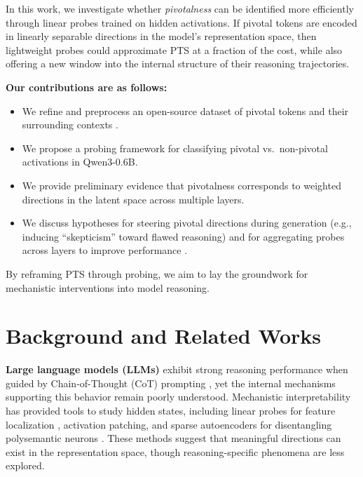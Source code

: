 \documentclass{article}
\begin{document}
In this work, we investigate whether \textit{pivotalness} can be identified more efficiently through linear probes trained on hidden activations. If pivotal tokens are encoded in linearly separable directions in the model's representation space, then lightweight probes could approximate PTS at a fraction of the cost, while also offering a new window into the internal structure of their reasoning trajectories.


\textbf{Our contributions are as follows:}
\begin{itemize}
    \item We refine and preprocess an open-source dataset of pivotal tokens and their surrounding contexts \citep{codelionQwen3}.
    \item We propose a probing framework for classifying pivotal vs.\ non-pivotal activations in Qwen3-0.6B.
    \item We provide preliminary evidence that pivotalness corresponds to weighted directions in the latent space across multiple layers.
    \item We discuss hypotheses for steering pivotal directions during generation (e.g., inducing ``skepticism'' toward flawed reasoning) \citep{huang2024steering, subramani2022extractinglatentsteeringvectors} and for aggregating probes across layers to improve performance \citep{zhu2025project_probe_aggregate, beaglehole2025universalsteeringmonitoringai}.
\end{itemize}

By reframing PTS through probing, we aim to lay the groundwork for mechanistic interventions into model reasoning.


\section{Background and Related Works}

\textbf{Large language models (LLMs)} exhibit strong reasoning performance when guided by Chain-of-Thought (CoT) prompting \citep{wei2023chainofthoughtpromptingelicitsreasoning}, yet the internal mechanisms supporting this behavior remain poorly understood. Mechanistic interpretability has provided tools to study hidden states, including linear probes for feature localization \citep{alain2018understandingintermediatelayersusing}, activation patching, and sparse autoencoders for disentangling polysemantic neurons \citep{bricken2023monosemanticity}. These methods suggest that meaningful directions can exist in the representation space, though reasoning-specific phenomena are less explored.
\end{document}
